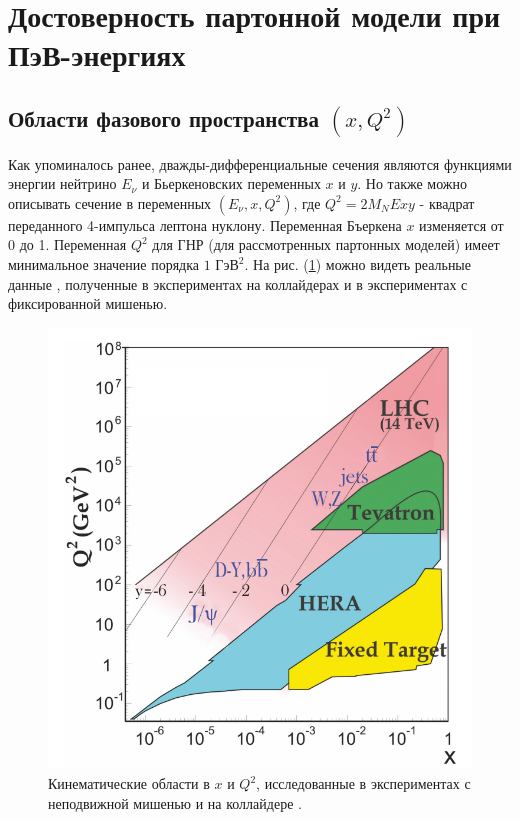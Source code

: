\section{Достоверность партонной модели при ПэВ-энергиях}
\subsection{Области фазового пространства $(x, Q^2)$}
Как упоминалось ранее, дважды-дифференциальные сечения являются функциями энергии нейтрино $E_{\nu}$ и Бьеркеновских переменных $x$ и $y$. Но также можно описывать сечение в переменных $(E_{\nu}, x,Q^2)$, где $Q^2 = 2M_NExy$ - квадрат переданного 4-импульса лептона нуклону. Переменная Бъеркена $x$ изменяется от 0 до 1. Переменная $Q^2$ для ГНР (для рассмотренных партонных моделей) имеет минимальное значение порядка $1$ $\text{ГэВ}^2$. На рис. (\ref{RD}) можно видеть реальные данные \cite{ParticleDataGroup:2024cfk}, полученные в экспериментах на коллайдерах и в экспериментах с фиксированной мишенью.  
\begin{figure}[!h]
\centering
\includegraphics[width=\linewidth]{images/NuProp/reald}
\caption{Кинематические области в $x$ и $Q^2$, исследованные в экспериментах с неподвижной мишенью и на коллайдере \cite{ParticleDataGroup:2024cfk}.}
\label{RD}
\end{figure}

